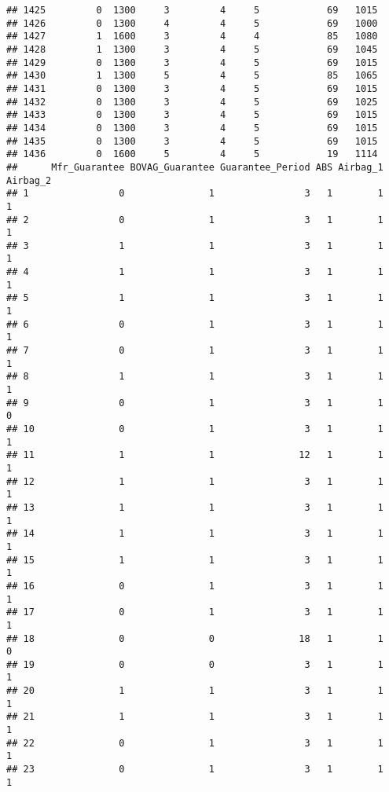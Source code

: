 \documentclass[]{article}
\begin{document}
\begin{verbatim}
## 1425         0  1300     3         4     5            69   1015
## 1426         0  1300     4         4     5            69   1000
## 1427         1  1600     3         4     4            85   1080
## 1428         1  1300     3         4     5            69   1045
## 1429         0  1300     3         4     5            69   1015
## 1430         1  1300     5         4     5            85   1065
## 1431         0  1300     3         4     5            69   1015
## 1432         0  1300     3         4     5            69   1025
## 1433         0  1300     3         4     5            69   1015
## 1434         0  1300     3         4     5            69   1015
## 1435         0  1300     3         4     5            69   1015
## 1436         0  1600     5         4     5            19   1114
##      Mfr_Guarantee BOVAG_Guarantee Guarantee_Period ABS Airbag_1 Airbag_2
## 1                0               1                3   1        1        1
## 2                0               1                3   1        1        1
## 3                1               1                3   1        1        1
## 4                1               1                3   1        1        1
## 5                1               1                3   1        1        1
## 6                0               1                3   1        1        1
## 7                0               1                3   1        1        1
## 8                1               1                3   1        1        1
## 9                0               1                3   1        1        0
## 10               0               1                3   1        1        1
## 11               1               1               12   1        1        1
## 12               1               1                3   1        1        1
## 13               1               1                3   1        1        1
## 14               1               1                3   1        1        1
## 15               1               1                3   1        1        1
## 16               0               1                3   1        1        1
## 17               0               1                3   1        1        1
## 18               0               0               18   1        1        0
## 19               0               0                3   1        1        1
## 20               1               1                3   1        1        1
## 21               1               1                3   1        1        1
## 22               0               1                3   1        1        1
## 23               0               1                3   1        1        1

\end{verbatim}
\end{document}
